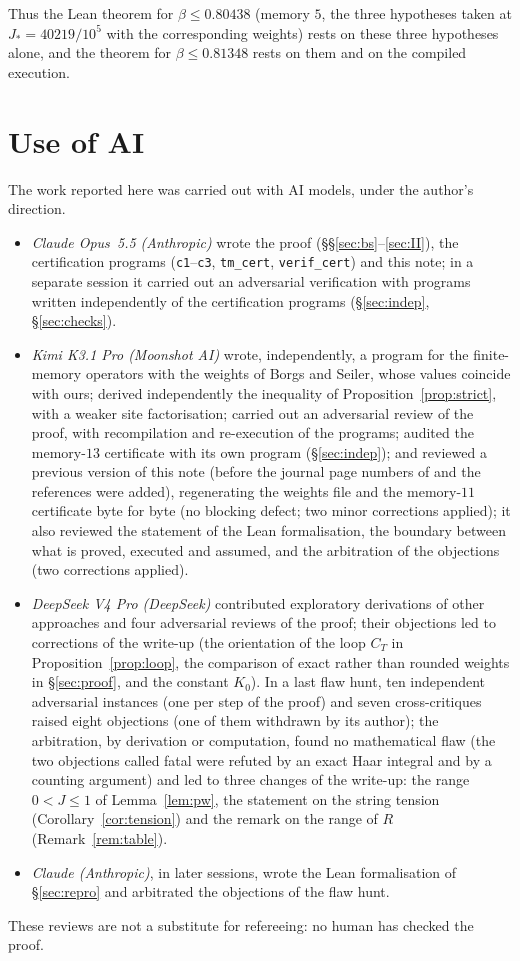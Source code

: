 \documentclass[11pt,a4paper]{article}
\theoremstyle{plain}
\theoremstyle{remark}
\numberwithin{equation}{section}
\begin{document}
Thus the Lean theorem for $\beta\le0.80438$ (memory $5$, the three hypotheses taken at $J_*=40219/10^5$ with the corresponding weights)
rests on these three hypotheses alone, and the theorem for $\beta\le0.81348$ rests on them and on the compiled execution.

\section*{Use of AI}\label{sec:ai}
The work reported here was carried out with AI models, under the author's direction.
\begin{itemize}
\item \emph{Claude Opus~5.5 (Anthropic)} wrote the proof (\S\S\ref{sec:bs}--\ref{sec:II}), the certification programs
(\texttt{c1}--\texttt{c3}, \texttt{tm\_cert}, \texttt{verif\_cert}) and this note; in a separate session it carried out an
adversarial verification with programs written independently of the certification programs (\S\ref{sec:indep}, \S\ref{sec:checks}).
\item \emph{Kimi K3.1 Pro (Moonshot AI)} wrote, independently, a program for the finite-memory operators with the weights of Borgs
and Seiler, whose values coincide with ours; derived independently the inequality of Proposition~\ref{prop:strict}, with a weaker
site factorisation; carried out an adversarial review of the proof, with recompilation and re-execution of the programs; audited
the memory-$13$ certificate with its own program (\S\ref{sec:indep}); and reviewed a previous version of this note (before the
journal page numbers of \cite{BS83} and the references \cite{Tom07,IS08} were added), regenerating the weights file and the
memory-$11$ certificate byte for byte (no blocking defect; two minor corrections applied); it also reviewed the statement of the Lean
formalisation, the boundary between what is proved, executed and assumed, and the arbitration of the objections (two corrections applied).
\item \emph{DeepSeek V4 Pro (DeepSeek)} contributed exploratory derivations of other approaches and four adversarial reviews of the
proof; their objections led to corrections of the write-up (the orientation of the loop $C_T$ in Proposition~\ref{prop:loop}, the
comparison of exact rather than rounded weights in \S\ref{sec:proof}, and the constant $K_0$). In a last flaw hunt, ten independent
adversarial instances (one per step of the proof) and seven cross-critiques raised eight objections (one of them withdrawn by its
author); the arbitration, by derivation or computation, found no mathematical flaw (the two objections called fatal were refuted by an exact Haar integral and by a counting
argument) and led to three changes of the write-up: the range $0<J\le1$ of Lemma~\ref{lem:pw}, the statement on the string tension
(Corollary~\ref{cor:tension}) and the remark on the range of $R$ (Remark~\ref{rem:table}).
\item \emph{Claude (Anthropic)}, in later sessions, wrote the Lean formalisation of \S\ref{sec:repro} and arbitrated the objections of
the flaw hunt.
\end{itemize}
These reviews are not a substitute for refereeing: no human has checked the proof.
\end{document}

